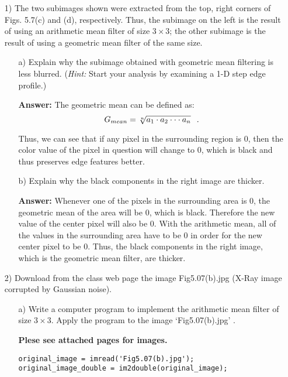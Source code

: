 \documentclass{article}
\begin{document}
\begin{enumerate}
\item[1)] The two subimages shown were extracted from the top, right corners of Figs. 5.7(c) and (d), respectively. Thus, the subimage on the left is the
result of using an arithmetic mean filter of size $3 \times 3$; the other subimage is the result of using a geometric mean filter of the same size.

\begin{enumerate}
\item[a)] Explain why the subimage obtained with geometric mean filtering is less
blurred. ({\it Hint:} Start your analysis by examining a 1-D step edge profile.)

\textbf{Answer: }The geometric mean can be defined as:
$$G_{mean} = \sqrt[n]{a_1 \cdot a_2 \cdot \cdot \cdot a_n} \hspace{0.1in} .$$

Thus, we can see that if any pixel in the surrounding region is 0, then the color value of the pixel in question will change to 0, which is black and thus preserves edge features better. 

\item[b)] Explain why the black components in the right image are thicker.

\textbf{Answer: }Whenever one of the pixels in the surrounding area is 0, the geometric mean of the area will be 0, which is black.  Therefore the new value of the center pixel will also be
0.  With the arithmetic mean, all of the values in the surrounding area have to be 0 in order for the new center pixel to be 0.  Thus, the black components in the right image, which is the
geometric mean filter, are thicker.

\end{enumerate}

\item[2)] Download from the class web page the image Fig5.07(b).jpg 
(X-Ray image corrupted by Gaussian noise). 

\begin{enumerate}
\item[a)] Write a computer program to implement the arithmetic mean filter of size $3 \times 3$. Apply the program to the image `Fig5.07(b).jpg' .

\textbf{Plese see attached pages for images.}

\begin{lstlisting}
original_image = imread('Fig5.07(b).jpg');
original_image_double = im2double(original_image);


\end{lstlisting}
\end{enumerate}
\end{enumerate}
\end{document}

